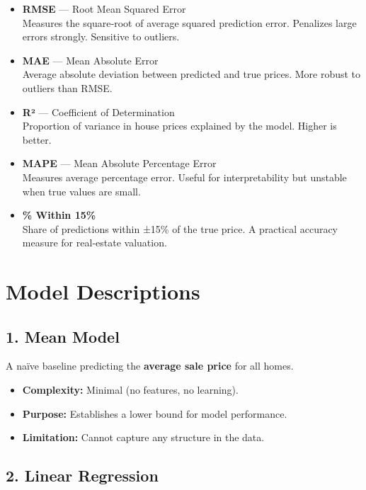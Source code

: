 \documentclass[
  english,
  letterpaper,
  DIV=11,
  numbers=noendperiod]{scrreprt}
\providecommand{\tightlist}{%
  \setlength{\itemsep}{0pt}\setlength{\parskip}{0pt}}
\begin{document}
\begin{itemize}
\item
  \textbf{RMSE} --- Root Mean Squared Error\\
  Measures the square‑root of average squared prediction error.
  Penalizes large errors strongly. Sensitive to outliers.
\item
  \textbf{MAE} --- Mean Absolute Error\\
  Average absolute deviation between predicted and true prices. More
  robust to outliers than RMSE.
\item
  \textbf{R²} --- Coefficient of Determination\\
  Proportion of variance in house prices explained by the model. Higher
  is better.
\item
  \textbf{MAPE} --- Mean Absolute Percentage Error\\
  Measures average percentage error. Useful for interpretability but
  unstable when true values are small.
\item
  \textbf{\% Within 15\%}\\
  Share of predictions within ±15\% of the true price. A practical
  accuracy measure for real‑estate valuation.
\end{itemize}

\section{Model Descriptions}\label{model-descriptions}

\subsection{1. Mean Model}\label{mean-model}

A naïve baseline predicting the \textbf{average sale price} for all
homes.

\begin{itemize}
\tightlist
\item
  \textbf{Complexity:} Minimal (no features, no learning).\\
\item
  \textbf{Purpose:} Establishes a lower bound for model performance.\\
\item
  \textbf{Limitation:} Cannot capture any structure in the data.
\end{itemize}

\subsection{2. Linear Regression}\label{linear-regression}
\end{document}
